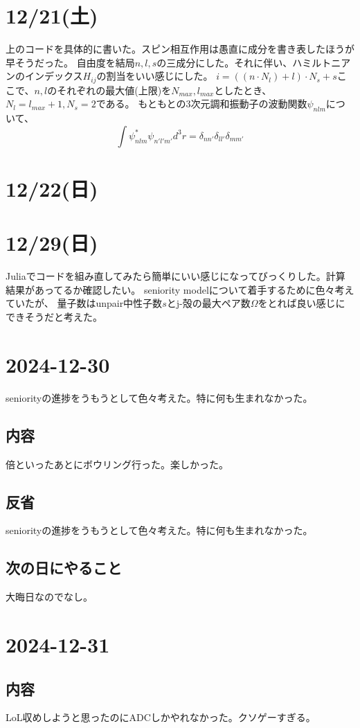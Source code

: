 \documentclass[a4paper,12pt]{jsreport}
\begin{document}
\section*{12/21(土)}
上のコードを具体的に書いた。スピン相互作用は愚直に成分を書き表したほうが早そうだった。
自由度を結局$n,l,s$の三成分にした。それに伴い、ハミルトニアンのインデックス$H_{ij}$の割当をいい感じにした。
$i=((n\cdot N_l)+l)\cdot N_s+s$ここで、$n,l$のそれぞれの最大値(上限)を$N_{max},l_{max}$としたとき、
$N_l=l_{max}+1,N_s=2$である。
もともとの3次元調和振動子の波動関数$\psi_{nlm}$について、
\begin{equation}
  \int\psi^{*}_{nlm}\psi_{n'l'm'}d^3r=\delta_{nn'}\delta_{ll'}\delta_{mm'}
\end{equation}
\section*{12/22(日)}
\section*{12/29(日)}
Juliaでコードを組み直してみたら簡単にいい感じになってびっくりした。計算結果があってるか確認したい。
seniority modelについて着手するために色々考えていたが、
量子数はunpair中性子数$s$とj-殻の最大ペア数$\Omega$をとれば良い感じにできそうだと考えた。
\section*{2024-12-30}
seniorityの進捗をうもうとして色々考えた。特に何も生まれなかった。
\subsection*{内容}
倍といったあとにボウリング行った。楽しかった。
\subsection*{反省}
seniorityの進捗をうもうとして色々考えた。特に何も生まれなかった。
\subsection*{次の日にやること}
大晦日なのでなし。
\section*{2024-12-31}
\subsection*{内容}
LoL収めしようと思ったのにADCしかやれなかった。クソゲーすぎる。
\end{document}
